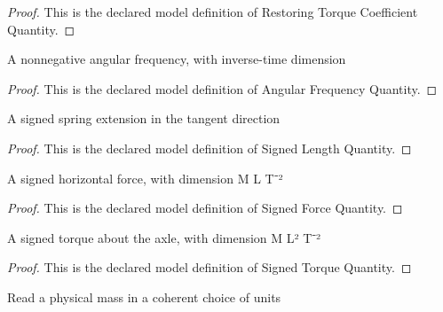 \begin{proof}
  This is the declared model definition of Restoring Torque Coefficient Quantity.
\end{proof}
\begin{definition}
  \label{def:physics:phyx-mini-0272:phyxminiproblems-problemphyxmini0272-angularfrequencyquantity}
  A nonnegative angular frequency, with inverse-time dimension
\end{definition}
\begin{proof}
  This is the declared model definition of Angular Frequency Quantity.
\end{proof}
\begin{definition}
  \label{def:physics:phyx-mini-0272:phyxminiproblems-problemphyxmini0272-signedlengthquantity}
  A signed spring extension in the tangent direction
\end{definition}
\begin{proof}
  This is the declared model definition of Signed Length Quantity.
\end{proof}
\begin{definition}
  \label{def:physics:phyx-mini-0272:phyxminiproblems-problemphyxmini0272-signedforcequantity}
  A signed horizontal force, with dimension M L T⁻²
\end{definition}
\begin{proof}
  This is the declared model definition of Signed Force Quantity.
\end{proof}
\begin{definition}
  \label{def:physics:phyx-mini-0272:phyxminiproblems-problemphyxmini0272-signedtorquequantity}
  A signed torque about the axle, with dimension M L² T⁻²
\end{definition}
\begin{proof}
  This is the declared model definition of Signed Torque Quantity.
\end{proof}
\begin{definition}
  \label{def:physics:phyx-mini-0272:phyxminiproblems-problemphyxmini0272-massreadout}
  Read a physical mass in a coherent choice of units
\end{definition}

